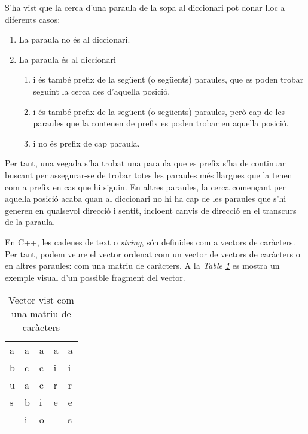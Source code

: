 \documentclass[titlepage]{article}
\begin{document}
S'ha vist que la cerca d'una paraula de la sopa al diccionari pot donar lloc a diferents casos:
\begin{enumerate}
  \item La paraula no és al diccionari.
  \item La paraula és al diccionari
    \begin{enumerate}
    \item i és també prefix de la següent (o següents) paraules, que es poden trobar seguint la cerca des d'aquella posició.
    \item i és també prefix de la següent (o següents) paraules, però cap de les paraules que la contenen de prefix es poden trobar en aquella posició.
    \item i no és prefix de cap paraula.
    \end{enumerate}
\end{enumerate}
Per tant, una vegada s'ha trobat una paraula que es prefix s'ha de continuar buscant per assegurar-se de trobar totes les paraules més llargues que la tenen com a prefix en cas que hi siguin. En altres paraules, la cerca començant per aquella posició acaba quan al diccionari no hi ha cap de les paraules que s'hi generen en qualsevol direcció i sentit, incloent canvis de direcció en el transcurs de la paraula.\newline\par

En C++, les cadenes de text o \textit{string}, són definides com a vectors de caràcters. Per tant, podem veure el vector ordenat com un vector de vectors de caràcters o en altres paraules: com una matriu de caràcters. A la \textit{Table \ref{fig:sortedVector1}} es mostra un exemple visual d'un possible fragment del vector. \newline
\begin{table}[H]
\begin{center}
\begin{tabular}{l|l|l|l|l|}
\hline
\multicolumn{1}{|l|}{a} & a & a & a & a \\
\multicolumn{1}{|l|}{b} & c & c & i & i \\
\multicolumn{1}{|l|}{u} & a & c & r & r \\
\multicolumn{1}{|l|}{s} & b & i & e & e \\ \cline{1-1} \cline{4-4}
                        & i & o &   & s \\ \cline{2-3} \cline{5-5} 
\end{tabular}
\caption{Vector vist com una matriu de caràcters}
            \label{fig:sortedVector1}
\end{center}
\end{table}
\end{document}
